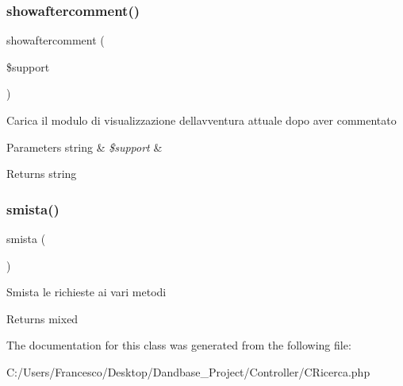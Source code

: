 \subsubsection{\texorpdfstring{showaftercomment()}{showaftercomment()}}
{\footnotesize\ttfamily showaftercomment (\begin{DoxyParamCaption}\item[{}]{\$support }\end{DoxyParamCaption})}

Carica il modulo di visualizzazione dell\textquotesingle{}avventura attuale dopo aver commentato


\begin{DoxyParams}[1]{Parameters}
string & {\em \$support} & \\
\hline
\end{DoxyParams}
\begin{DoxyReturn}{Returns}
string 
\end{DoxyReturn}
\mbox{\label{class_c_ricerca_afc7ba180569cef3535974cfc4a1211f1}} 
\subsubsection{\texorpdfstring{smista()}{smista()}}
{\footnotesize\ttfamily smista (\begin{DoxyParamCaption}{ }\end{DoxyParamCaption})}

Smista le richieste ai vari metodi

\begin{DoxyReturn}{Returns}
mixed 
\end{DoxyReturn}


The documentation for this class was generated from the following file\+:\begin{DoxyCompactItemize}
\item 
C\+:/\+Users/\+Francesco/\+Desktop/\+Dandbase\+\_\+\+Project/\+Controller/C\+Ricerca.\+php\end{DoxyCompactItemize}
